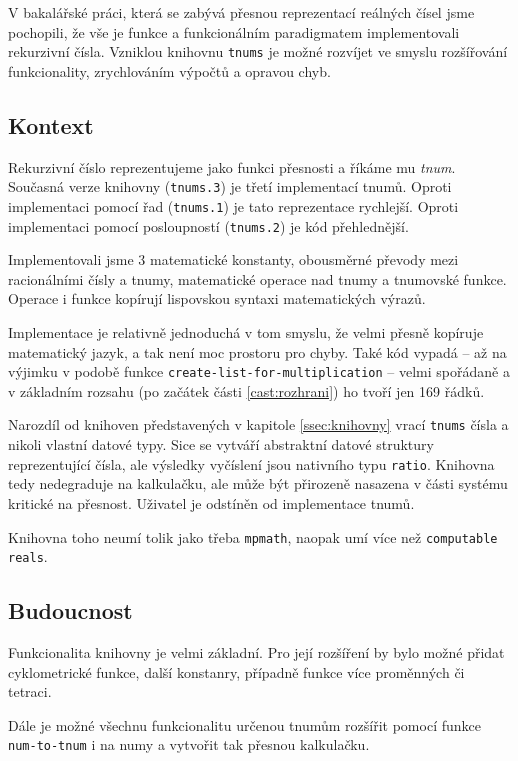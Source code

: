 V bakalářské práci, která se zabývá přesnou reprezentací reálných čísel jsme pochopili, že vše je funkce a funkcionálním paradigmatem implementovali rekurzivní čísla. Vzniklou knihovnu \texttt{tnums} je možné rozvíjet ve smyslu rozšířování funkcionality, zrychlováním výpočtů a opravou chyb.

\subsection{Kontext}
Rekurzivní číslo reprezentujeme jako funkci přesnosti a říkáme mu \textit{tnum}. Současná verze knihovny (\texttt{tnums.3}) je třetí implementací tnumů. Oproti implementaci pomocí řad (\texttt{tnums.1}) je tato reprezentace rychlejší. Oproti implementaci pomocí posloupností (\texttt{tnums.2}) je kód přehlednější.

Implementovali jsme 3 matematické konstanty, obousměrné převody mezi racionálními čísly a tnumy, matematické operace nad tnumy a tnumovské funkce. Operace i funkce kopírují lispovskou syntaxi matematických výrazů.

Implementace je relativně jednoduchá v tom smyslu, že velmi přesně kopíruje matematický jazyk, a tak není moc prostoru pro chyby. Také kód vypadá -- až na výjimku v podobě funkce \texttt{create-list-for-multiplication} -- velmi spořádaně a v základním rozsahu (po začátek části \ref{cast:rozhrani}) ho tvoří jen 169 řádků.

Narozdíl od knihoven představených v kapitole \ref{ssec:knihovny} vrací \texttt{tnums} čísla a nikoli vlastní datové typy. Sice se vytváří abstraktní datové struktury reprezentující čísla, ale výsledky vyčíslení jsou nativního typu \texttt{ratio}. Knihovna tedy nedegraduje na kalkulačku, ale může být přirozeně nasazena v části systému kritické na přesnost. Uživatel je odstíněn od implementace tnumů.

Knihovna toho neumí tolik jako třeba \texttt{mpmath}, naopak umí více než \texttt{computable reals}.

\subsection{Budoucnost}
Funkcionalita knihovny je velmi základní. Pro její rozšíření by bylo možné přidat cyklometrické funkce, další konstanry, případně funkce více proměnných či tetraci.

Dále je možné všechnu funkcionalitu určenou tnumům rozšířit pomocí funkce \texttt{num-to-tnum} i na numy a vytvořit tak přesnou kalkulačku.

